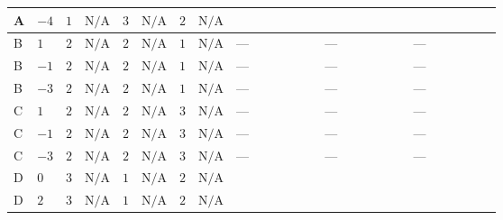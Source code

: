 \documentclass[8pt]{article}
\begin{document}
\begin{landscape}
\begin{longtable}{@{}llcccccc >{\raggedright\arraybackslash}p{0.21\linewidth} >{\raggedright\arraybackslash}p{0.21\linewidth} >{\raggedright\arraybackslash}p{0.21\linewidth}@{}}
\midrule
A & $-4$ & $1$ & $\text{N/A}$ & $3$ & $\text{N/A}$ & $2$ & $\text{N/A}$ & \scriptsize\adjustbox{max width=\linewidth}{$\begin{gathered} -\frac{33 {g_2}^2 {\lambda_{HS_2}^{(1)}}}{2}\end{gathered}$} & \scriptsize\adjustbox{max width=\linewidth}{$\begin{gathered} +3 {g_1}^4\end{gathered}$} & \scriptsize\adjustbox{max width=\linewidth}{$\begin{gathered} -\frac{15 {g_1}^2 {\lambda_{HS_2}^{(1)}}}{2}\end{gathered}$} \\
\midrule
B & $1$ & $2$ & $\text{N/A}$ & $2$ & $\text{N/A}$ & $1$ & $\text{N/A}$ & --- & --- & --- \\
\midrule
B & $-1$ & $2$ & $\text{N/A}$ & $2$ & $\text{N/A}$ & $1$ & $\text{N/A}$ & --- & --- & --- \\
\midrule
B & $-3$ & $2$ & $\text{N/A}$ & $2$ & $\text{N/A}$ & $1$ & $\text{N/A}$ & --- & --- & --- \\
\midrule
C & $1$ & $2$ & $\text{N/A}$ & $2$ & $\text{N/A}$ & $3$ & $\text{N/A}$ & --- & --- & --- \\
\midrule
C & $-1$ & $2$ & $\text{N/A}$ & $2$ & $\text{N/A}$ & $3$ & $\text{N/A}$ & --- & --- & --- \\
\midrule
C & $-3$ & $2$ & $\text{N/A}$ & $2$ & $\text{N/A}$ & $3$ & $\text{N/A}$ & --- & --- & --- \\
\midrule
D & $0$ & $3$ & $\text{N/A}$ & $1$ & $\text{N/A}$ & $2$ & $\text{N/A}$ & \scriptsize\adjustbox{max width=\linewidth}{$\begin{gathered} -\frac{9 {g_2}^2 {\lambda_{HS_2}^{(1)}}}{2}\end{gathered}$} & \scriptsize\adjustbox{max width=\linewidth}{$\begin{gathered} +3 {g_1}^4\end{gathered}$} & \scriptsize\adjustbox{max width=\linewidth}{$\begin{gathered} -\frac{15 {g_1}^2 {\lambda_{HS_2}^{(1)}}}{2}\end{gathered}$} \\
\midrule
D & $2$ & $3$ & $\text{N/A}$ & $1$ & $\text{N/A}$ & $2$ & $\text{N/A}$ & \scriptsize\adjustbox{max width=\linewidth}{$\begin{gathered} -\frac{9 {g_2}^2 {\lambda_{HS_2}^{(1)}}}{2}\end{gathered}$} & \scriptsize\adjustbox{max width=\linewidth}{$\begin{gathered} +12 {g_1}^4\end{gathered}$} & \scriptsize\adjustbox{max width=\linewidth}{$\begin{gathered} -\frac{51 {g_1}^2 {\lambda_{HS_2}^{(1)}}}{2}\end{gathered}$} \\

\end{longtable}
\end{landscape}
\end{document}
